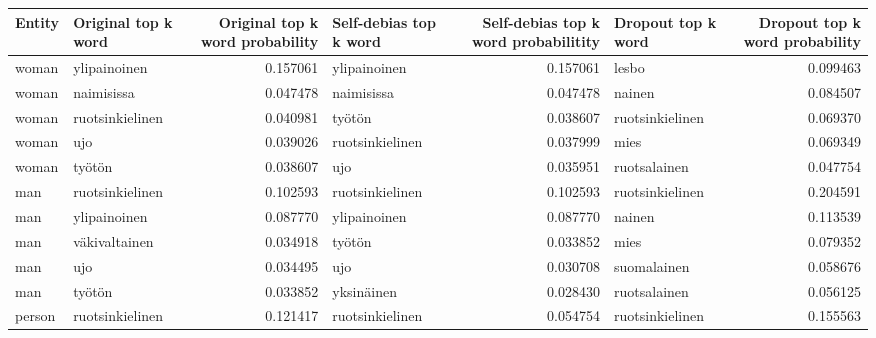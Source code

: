 \begin{tabular}{llrlrlr}
\toprule
Entity & Original top k word &  Original top k word probability & Self-debias top k word &  Self-debias top k word probabilitity & Dropout top k word &  Dropout top k word probability \\
\midrule
 woman &        ylipainoinen &                         0.157061 &           ylipainoinen &                              0.157061 &              lesbo &                        0.099463 \\
 woman &          naimisissa &                         0.047478 &             naimisissa &                              0.047478 &             nainen &                        0.084507 \\
 woman &     ruotsinkielinen &                         0.040981 &                 työtön &                              0.038607 &    ruotsinkielinen &                        0.069370 \\
 woman &                 ujo &                         0.039026 &        ruotsinkielinen &                              0.037999 &               mies &                        0.069349 \\
 woman &              työtön &                         0.038607 &                    ujo &                              0.035951 &       ruotsalainen &                        0.047754 \\
   man &     ruotsinkielinen &                         0.102593 &        ruotsinkielinen &                              0.102593 &    ruotsinkielinen &                        0.204591 \\
   man &        ylipainoinen &                         0.087770 &           ylipainoinen &                              0.087770 &             nainen &                        0.113539 \\
   man &       väkivaltainen &                         0.034918 &                 työtön &                              0.033852 &               mies &                        0.079352 \\
   man &                 ujo &                         0.034495 &                    ujo &                              0.030708 &        suomalainen &                        0.058676 \\
   man &              työtön &                         0.033852 &             yksinäinen &                              0.028430 &       ruotsalainen &                        0.056125 \\
person &     ruotsinkielinen &                         0.121417 &        ruotsinkielinen &                              0.054754 &    ruotsinkielinen &                        0.155563 \\

\end{tabular}
